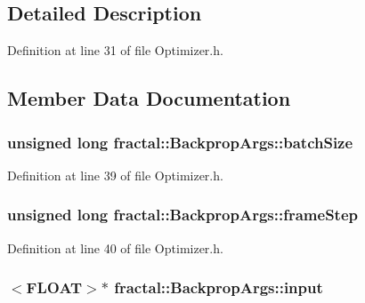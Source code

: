 \subsection{Detailed Description}


Definition at line 31 of file Optimizer.\+h.



\subsection{Member Data Documentation}
\hypertarget{classfractal_1_1BackpropArgs_ae346e9a842f88c30daa10d6edbc30bf4}{
\subsubsection[{batch\+Size}]{\setlength{\rightskip}{0pt plus 5cm}unsigned long fractal\+::\+Backprop\+Args\+::batch\+Size}}\label{classfractal_1_1BackpropArgs_ae346e9a842f88c30daa10d6edbc30bf4}


Definition at line 39 of file Optimizer.\+h.

\hypertarget{classfractal_1_1BackpropArgs_ae78c53109f97e43a3f4b167e6b562653}{
\subsubsection[{frame\+Step}]{\setlength{\rightskip}{0pt plus 5cm}unsigned long fractal\+::\+Backprop\+Args\+::frame\+Step}}\label{classfractal_1_1BackpropArgs_ae78c53109f97e43a3f4b167e6b562653}


Definition at line 40 of file Optimizer.\+h.

\hypertarget{classfractal_1_1BackpropArgs_a4e54ce09681eabdfad307e202a352fe8}{
\subsubsection[{input}]{$<${\bf F\+L\+O\+A\+T}$>$$\ast$ fractal\+::\+Backprop\+Args\+::input}}\label{classfractal_1_1BackpropArgs_a4e54ce09681eabdfad307e202a352fe8}


